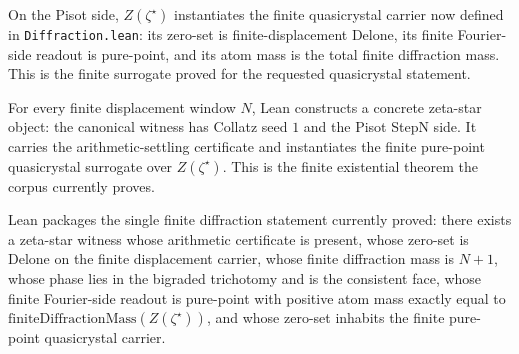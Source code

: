 \begin{theorem}
  \label{thm:zeta-star-finite-pure-point-quasicrystal}
  \leanok
  On the Pisot side, \(Z(\zeta^\star)\) instantiates the finite quasicrystal
  carrier now defined in \texttt{Diffraction.lean}: its zero-set is
  finite-displacement Delone, its finite Fourier-side readout is pure-point,
  and its atom mass is the total finite diffraction mass.  This is the
  finite surrogate proved for the requested quasicrystal statement.
\end{theorem}

\begin{theorem}
  \label{thm:exists-zeta-star-finite-quasicrystal}
  \leanok
  For every finite displacement window \(N\), Lean constructs a concrete
  zeta-star object: the canonical witness has Collatz seed \(1\) and the Pisot
  StepN side.  It carries the arithmetic-settling certificate and instantiates
  the finite pure-point quasicrystal surrogate over \(Z(\zeta^\star)\).  This is
  the finite existential theorem the corpus currently proves.
\end{theorem}

\begin{theorem}
  \label{thm:zeta-star-finite-dyson-quasicrystal-form}
  \leanok
  Lean packages the single finite diffraction statement currently proved:
  there exists a zeta-star witness whose arithmetic certificate is present,
  whose zero-set is Delone on the finite displacement carrier, whose finite
  diffraction mass is \(N+1\), whose phase lies in the bigraded trichotomy and
  is the consistent face, whose finite Fourier-side readout is pure-point with
  positive atom mass exactly equal to \(\mathrm{finiteDiffractionMass}
  (Z(\zeta^\star))\), and whose zero-set inhabits the finite pure-point
  quasicrystal carrier.
\end{theorem}

